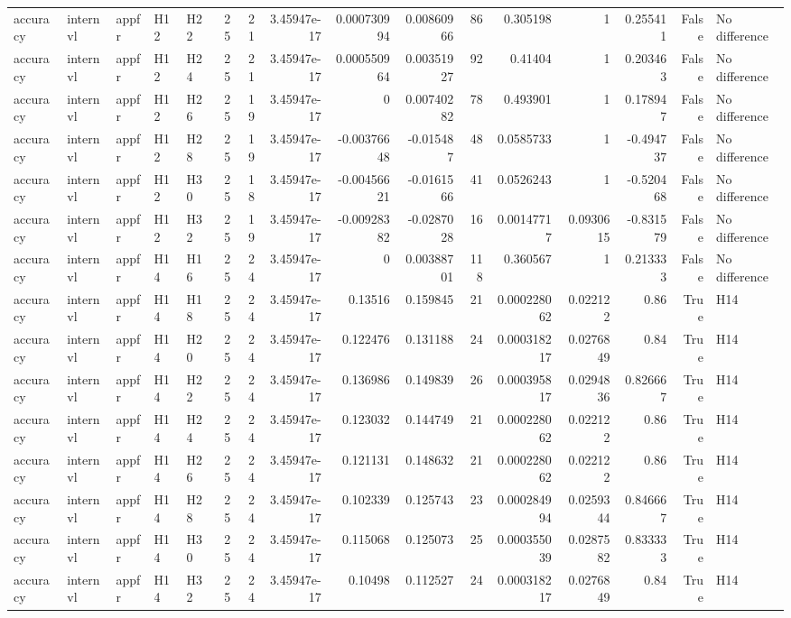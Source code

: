 \begin{longtable}{lllllrrrrrrrrrrl}
accuracy & internvl & appfr & H12 & H22 & 25 & 21 & 3.45947e-17 & 0.000730994 & 0.00860966 & 86 & 0.305198 & 1 & 0.255411 & False & No difference \\
accuracy & internvl & appfr & H12 & H24 & 25 & 21 & 3.45947e-17 & 0.000550964 & 0.00351927 & 92 & 0.41404 & 1 & 0.203463 & False & No difference \\
accuracy & internvl & appfr & H12 & H26 & 25 & 19 & 3.45947e-17 & 0 & 0.00740282 & 78 & 0.493901 & 1 & 0.178947 & False & No difference \\
accuracy & internvl & appfr & H12 & H28 & 25 & 19 & 3.45947e-17 & -0.00376648 & -0.015487 & 48 & 0.0585733 & 1 & -0.494737 & False & No difference \\
accuracy & internvl & appfr & H12 & H30 & 25 & 18 & 3.45947e-17 & -0.00456621 & -0.0161566 & 41 & 0.0526243 & 1 & -0.520468 & False & No difference \\
accuracy & internvl & appfr & H12 & H32 & 25 & 19 & 3.45947e-17 & -0.00928382 & -0.0287028 & 16 & 0.00147717 & 0.0930615 & -0.831579 & False & No difference \\
accuracy & internvl & appfr & H14 & H16 & 25 & 24 & 3.45947e-17 & 0 & 0.00388701 & 118 & 0.360567 & 1 & 0.213333 & False & No difference \\
accuracy & internvl & appfr & H14 & H18 & 25 & 24 & 3.45947e-17 & 0.13516 & 0.159845 & 21 & 0.000228062 & 0.022122 & 0.86 & True & H14 \\
accuracy & internvl & appfr & H14 & H20 & 25 & 24 & 3.45947e-17 & 0.122476 & 0.131188 & 24 & 0.000318217 & 0.0276849 & 0.84 & True & H14 \\
accuracy & internvl & appfr & H14 & H22 & 25 & 24 & 3.45947e-17 & 0.136986 & 0.149839 & 26 & 0.000395817 & 0.0294836 & 0.826667 & True & H14 \\
accuracy & internvl & appfr & H14 & H24 & 25 & 24 & 3.45947e-17 & 0.123032 & 0.144749 & 21 & 0.000228062 & 0.022122 & 0.86 & True & H14 \\
accuracy & internvl & appfr & H14 & H26 & 25 & 24 & 3.45947e-17 & 0.121131 & 0.148632 & 21 & 0.000228062 & 0.022122 & 0.86 & True & H14 \\
accuracy & internvl & appfr & H14 & H28 & 25 & 24 & 3.45947e-17 & 0.102339 & 0.125743 & 23 & 0.000284994 & 0.0259344 & 0.846667 & True & H14 \\
accuracy & internvl & appfr & H14 & H30 & 25 & 24 & 3.45947e-17 & 0.115068 & 0.125073 & 25 & 0.000355039 & 0.0287582 & 0.833333 & True & H14 \\
accuracy & internvl & appfr & H14 & H32 & 25 & 24 & 3.45947e-17 & 0.10498 & 0.112527 & 24 & 0.000318217 & 0.0276849 & 0.84 & True & H14 \\

\end{longtable}
